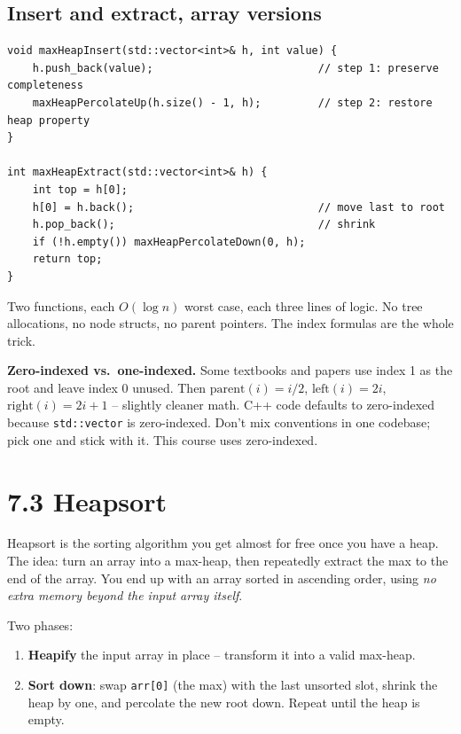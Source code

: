 \documentclass[11pt]{article}
\begin{document}
\subsection*{Insert and extract, array versions}

\begin{lstlisting}
void maxHeapInsert(std::vector<int>& h, int value) {
    h.push_back(value);                          // step 1: preserve completeness
    maxHeapPercolateUp(h.size() - 1, h);         // step 2: restore heap property
}

int maxHeapExtract(std::vector<int>& h) {
    int top = h[0];
    h[0] = h.back();                             // move last to root
    h.pop_back();                                // shrink
    if (!h.empty()) maxHeapPercolateDown(0, h);
    return top;
}
\end{lstlisting}

Two functions, each $O(\log n)$ worst case, each three lines of logic. No tree allocations, no node structs, no parent pointers. The index formulas are the whole trick.

\begin{notebox}
\textbf{Zero-indexed vs.\ one-indexed.} Some textbooks and papers use index 1 as the root and leave index 0 unused. Then $\text{parent}(i) = i/2$, $\text{left}(i) = 2i$, $\text{right}(i) = 2i + 1$ -- slightly cleaner math. C++ code defaults to zero-indexed because \texttt{std::vector} is zero-indexed. Don't mix conventions in one codebase; pick one and stick with it. This course uses zero-indexed.
\end{notebox}

\section{7.3 Heapsort}

Heapsort is the sorting algorithm you get almost for free once you have a heap. The idea: turn an array into a max-heap, then repeatedly extract the max to the end of the array. You end up with an array sorted in ascending order, using \emph{no extra memory beyond the input array itself}.

Two phases:
\begin{enumerate}[leftmargin=*]
    \item \textbf{Heapify} the input array in place -- transform it into a valid max-heap.
    \item \textbf{Sort down}: swap \texttt{arr[0]} (the max) with the last unsorted slot, shrink the heap by one, and percolate the new root down. Repeat until the heap is empty.
\end{enumerate}
\end{document}
